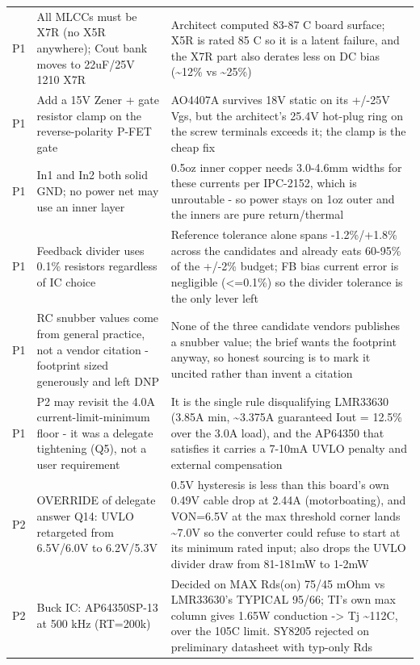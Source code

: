 \documentclass[11pt,a4paper]{article}
\begin{document}
{\begin{longtable}{lp{5.2cm}p{7.2cm}}
P1 & All MLCCs must be X7R (no X5R anywhere); Cout bank moves to 22uF/25V 1210 X7R & Architect computed 83-87 C board surface; X5R is rated 85 C so it is a latent failure, and the X7R part also derates less on DC bias (\textasciitilde{}12\% vs \textasciitilde{}25\%) \\
P1 & Add a 15V Zener + gate resistor clamp on the reverse-polarity P-FET gate & AO4407A survives 18V static on its +/-25V Vgs, but the architect's 25.4V hot-plug ring on the screw terminals exceeds it; the clamp is the cheap fix \\
P1 & In1 and In2 both solid GND; no power net may use an inner layer & 0.5oz inner copper needs 3.0-4.6mm widths for these currents per IPC-2152, which is unroutable - so power stays on 1oz outer and the inners are pure return/thermal \\
P1 & Feedback divider uses 0.1\% resistors regardless of IC choice & Reference tolerance alone spans -1.2\%/+1.8\% across the candidates and already eats 60-95\% of the +/-2\% budget; FB bias current error is negligible (\textless{}=0.1\%) so the divider tolerance is the only lever left \\
P1 & RC snubber values come from general practice, not a vendor citation - footprint sized generously and left DNP & None of the three candidate vendors publishes a snubber value; the brief wants the footprint anyway, so honest sourcing is to mark it uncited rather than invent a citation \\
P1 & P2 may revisit the 4.0A current-limit-minimum floor - it was a delegate tightening (Q5), not a user requirement & It is the single rule disqualifying LMR33630 (3.85A min, \textasciitilde{}3.375A guaranteed Iout = 12.5\% over the 3.0A load), and the AP64350 that satisfies it carries a 7-10mA UVLO penalty and external compensation \\
P2 & OVERRIDE of delegate answer Q14: UVLO retargeted from 6.5V/6.0V to 6.2V/5.3V & 0.5V hysteresis is less than this board's own 0.49V cable drop at 2.44A (motorboating), and VON=6.5V at the max threshold corner lands \textasciitilde{}7.0V so the converter could refuse to start at its minimum rated input; also drops the UVLO divider draw from 81-181mW to 1-2mW \\
P2 & Buck IC: AP64350SP-13 at 500 kHz (RT=200k) & Decided on MAX Rds(on) 75/45 mOhm vs LMR33630's TYPICAL 95/66; TI's own max column gives 1.65W conduction -\textgreater{} Tj \textasciitilde{}112C, over the 105C limit. SY8205 rejected on preliminary datasheet with typ-only Rds \\

\end{longtable}}
\end{document}
